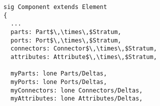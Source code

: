\lstset{frame=tb, aboveskip=12pt, belowskip=-3pt, breaklines=true, basicstyle=\small\ttfamily, tabsize=2, mathescape=true}
\begin{lstlisting}[caption={structure.als, lines 74-91}, label=alloy:component, captionpos=b]
sig Component extends Element
{
  ...
  parts: Part$\,\times\,$Stratum,
  ports: Port$\,\times\,$Stratum,
  connectors: Connector$\,\times\,$Stratum,
  attributes: Attribute$\,\times\,$Stratum,
  
  myParts: lone Parts/Deltas,
  myPorts: lone Ports/Deltas,
  myConnectors: lone Connectors/Deltas,
  myAttributes: lone Attributes/Deltas,
\end{lstlisting}